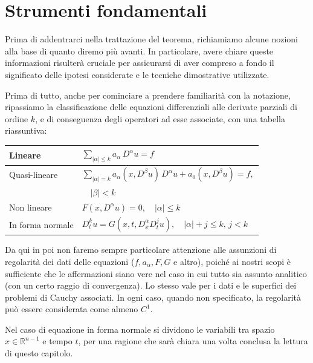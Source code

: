 \chapter{Strumenti fondamentali} \label{tools}
Prima di addentrarci nella trattazione del teorema, richiamiamo alcune nozioni alla base di quanto diremo più avanti. 
In particolare, avere chiare queste informazioni risulterà cruciale per assicurarsi di aver compreso a fondo il significato delle ipotesi considerate e le tecniche dimostrative utilizzate.

Prima di tutto, anche per cominciare a prendere familiarità con la notazione, ripassiamo la classificazione delle equazioni differenziali alle derivate parziali di ordine $k$, e di conseguenza degli operatori ad esse associate, con una tabella riassuntiva:
\vspace{5mm}
\begin{center}
\renewcommand{\arraystretch}{2}
\begin{tabular}{l l} 
\hline \hline
 Lineare & $\sum_{|\alpha |\leq k} a_\alpha \, D^\alpha u = f$ \\
 \hline
 \vspace{-2mm}
 Quasi-lineare & $\sum_{|\alpha |= k} a_\alpha (x,D^\beta u) \, D^\alpha u +  a_0(x,D^\beta u)= f,$\\
 & $\quad |\beta |<k $ \\
 \hline
 Non lineare & $F(x,D^\alpha u)=0, \quad |\alpha | \leq k$ \\
 \hline
 In forma normale & $D_{t}^k u = G(x,t, D^\alpha_x D^j_t u), \quad |\alpha |+j \leq k, \, j < k$ \\
 \hline \hline
\end{tabular}
\end{center}
\vspace{5mm}
\begin{remark}
Da qui in poi non faremo sempre particolare attenzione alle assunzioni di regolarità dei dati delle equazioni ($f,a_\alpha,F,G$ e altro), poiché ai nostri scopi è sufficiente che le affermazioni siano vere nel caso in cui tutto sia assunto analitico (con un certo raggio di convergenza). Lo stesso vale per i dati e le superfici dei problemi di Cauchy associati. In ogni caso, quando non specificato, la regolarità può essere considerata come almeno $C^1$.
\end{remark}
\begin{remark}
Nel caso di equazione in forma normale si dividono le variabili tra spazio $x\in \mathbb{R}^{n-1}$ e tempo $t$, per una ragione che sarà chiara una volta conclusa la lettura di questo capitolo.
\end{remark}
